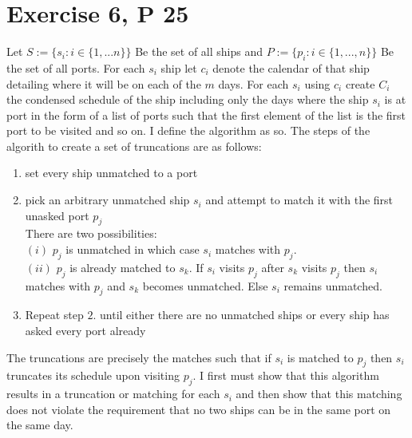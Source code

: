 \documentclass{amsart}
\begin{document}
\section{Exercise 6, P 25}
Let $S := \{s_i : i \in \{1,...n\}\}$ Be the set of all ships and  $P := \{p_i : i \in \{1,...,n\}\}$ Be the set of all
ports. For each  $s_i$ ship let $c_i$ denote the calendar of that ship detailing where it will be on each of the  $m$ days.
For each $s_i$ using $c_i$ create $C_i$ the condensed schedule of the ship including only the days where the ship $s_i$ is 
at port in the form of a list of ports such that the first element of the list is the first port to be visited and so on.
I define the algorithm as so. The steps of the algorith to create a set of truncations are as follows:\\
\begin{enumerate}
    \item set every ship unmatched to a port
    \item pick an arbitrary unmatched ship $s_i$ and attempt to match it with the first unasked port $p_j$\\
        There are two possibilities:\\
        $(i)$ $p_j$ is unmatched in which case $s_i$ matches with $p_j$.\\
        $(ii)$ $p_j$ is already matched to $s_k$. If $s_i$ visits $p_j$ after $s_k$ visits $p_j$ then $s_i$ matches with $p_j$ and $s_k$
        becomes unmatched. Else $s_i$ remains unmatched.
    \item Repeat step $2.$ until either there are no unmatched ships or every ship has asked every port already
\end{enumerate}
The truncations are precisely the matches such that if $s_i$ is matched to $p_j$ then $s_i$ truncates its schedule upon visiting $p_j$.
I first must show that this algorithm results in a truncation or matching for each $s_i$ and then show that this matching does not violate the requirement
that no two ships can be in the same port on the same day.
\end{document}
